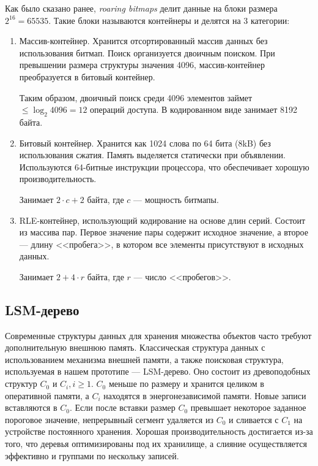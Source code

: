 Как было сказано ранее, \textit{roaring bitmaps} делит данные на блоки размера
$2^{16} = 65535$. Такие блоки называются контейнеры и делятся на 3 категории:
\begin{enumerate}
    \label{bitmap}
    \item Массив-контейнер. Хранится отсортированный массив данных без использования
    битмап. Поиск организуется двоичным поиском. При превышении размера структуры
    значения 4096, массив-контейнер преобразуется в битовый контейнер.

    Таким образом, двоичный поиск среди 4096 элементов займет $\leq \log_2{4096}
    = 12$ операций доступа. В кодированном виде занимает 8192 байта.
    \item Битовый контейнер. Хранится как 1024 слова по 64 бита (8kB) без
    использования сжатия. Память выделяется статически при объявлении. Используются
    64-битные инструкции процессора, что обеспечивает хорошую производительность.

    Занимает $2 \cdot c+2$ байта, где $c$ — мощность битмапы.
    \item RLE-контейнер, использующий кодирование на основе длин серий. Состоит
    из массива пар. Первое значение пары содержит исходное значение, а второе —
    длину <<пробега>>, в котором все элементы присутствуют в исходных данных.

    Занимает $2+4\cdot r$ байта, где $r$ — число <<пробегов>>.
\end{enumerate}

\subsection{LSM-дерево}

Современные структуры данных для хранения множества объектов часто требуют
дополнительную внешнюю память. Классическая структура данных с использованием механизма
внешней памяти, а также поисковая структура, используемая в нашем прототипе —
LSM-дерево. Оно состоит из древоподобных структур $C_0$ и $C_i, i \ge 1$.
$C_0$ меньше по размеру и хранится
целиком в оперативной памяти, а $C_i$ находятся в энергонезависимой памяти. Новые
записи вставляются в $C_0$. Если после вставки размер $C_0$ превышает некоторое заданное
пороговое значение, непрерывный сегмент удаляется из $C_0$ и сливается с $C_1$ на устройстве
постоянного хранения. Хорошая производительность достигается из-за того, что деревья
оптимизированы под их хранилище, а слияние осуществляется эффективно и группами по
нескольку записей.

